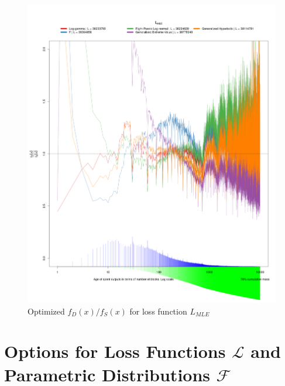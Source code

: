 \documentclass[english]{article}
\begin{document}
\begin{figure}
\caption{Optimized $f_{D}(x)/f_{S}(x)$ for loss function $L_{MLE}$}

\includegraphics[scale=0.35]{images/dry-run/estimate-div-target/estimate-div-target-L_MLE-flavor-0}
\end{figure}


\section{Options for Loss Functions $\boldsymbol{\mathcal{L}}$ and Parametric
Distributions $\boldsymbol{\mathcal{F}}$\label{sec:Options-for-Loss-Functions}}
\end{document}
